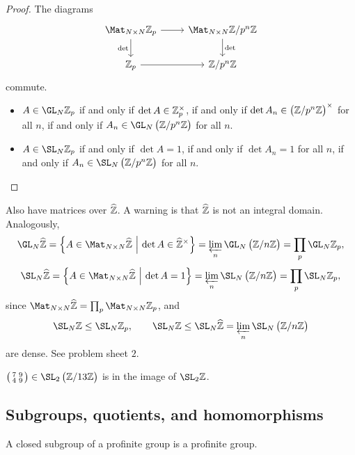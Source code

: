\begin{proof}
The diagrams
$$
\begin{tikzcd}
\Mat_{N \times N} \ZZ_p \arrow{r} \arrow{d}[swap]{\det} & \Mat_{N \times N} \ZZ / p^n\ZZ \arrow{d}{\det} \\
\ZZ_p \arrow{r} & \ZZ / p^n\ZZ
\end{tikzcd}
$$
commute.
\begin{itemize}
\item $ A \in \GL_N \ZZ_p $ if and only if $ \det A \in \mathbb{Z}_p^\times $, if and only if $ \det A_n \in \br{\ZZ / p^n\ZZ}^\times $ for all $ n $, if and only if $ A_n \in \GL_N \br{\ZZ / p^n\ZZ} $ for all $ n $.
\item $ A \in \SL_N \ZZ_p $ if and only if $ \det A = 1 $, if and only if $ \det A_n = 1 $ for all $ n $, if and only if $ A_n \in \SL_N \br{\ZZ / p^n\ZZ} $ for all $ n $.
\end{itemize}
\end{proof}

Also have matrices over $ \widehat{\mathbb{Z}} $. A warning is that $ \widehat{\mathbb{Z}} $ is not an integral domain. Analogously,
$$ \GL_N \widehat{\ZZ} = \cbr{A \in \Mat_{N \times N} \widehat{\ZZ} \st \det A \in \widehat{\ZZ}^\times} = \varprojlim_n \GL_N \br{\ZZ / n\ZZ} = \prod_p \GL_N \ZZ_p, $$
$$ \SL_N \widehat{\ZZ} = \cbr{A \in \Mat_{N \times N} \widehat{\ZZ} \st \det A = 1} = \varprojlim_n \SL_N \br{\ZZ / n\ZZ} = \prod_p \SL_N \ZZ_p, $$
since $ \Mat_{N \times N} \widehat{\ZZ} = \prod_p \Mat_{N \times N} \ZZ_p $, and
$$ \SL_N \ZZ \le \SL_N \ZZ_p, \qquad \SL_N \ZZ \le \SL_N \widehat{\ZZ} = \varprojlim_n \SL_N \br{\ZZ / n\ZZ} $$
are dense. See problem sheet $ 2 $.

\begin{example}
$ \twobytwosmall{7}{9}{4}{9} \in \SL_2 \br{\ZZ / 13\ZZ} $ is in the image of $ \SL_2 \ZZ $.
\end{example}

\pagebreak

\subsection{Subgroups, quotients, and homomorphisms}

\begin{proposition}
A closed subgroup of a profinite group is a profinite group.
\end{proposition}

